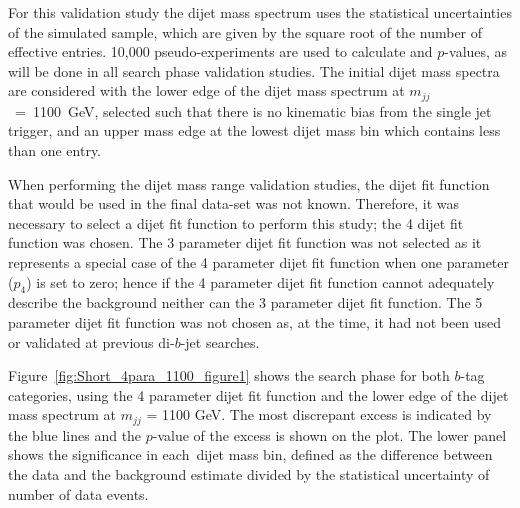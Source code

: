 For this validation study the dijet mass spectrum uses 
the statistical uncertainties of the simulated sample,
which are given by the square root of the number of effective entries.
10,000 pseudo-experiments are used to calculate \bh{} and \dhunt{} $p$-values, as will be done in all \summer{} search phase validation studies.
The initial dijet mass spectra are considered with the lower edge of the dijet mass spectrum at $m_{jj}$~=~1100~GeV,
selected such that there is no kinematic bias from the single jet trigger,
and an upper mass edge at the lowest dijet mass bin which contains less than one entry.

When performing the dijet mass range validation studies,
the dijet fit function that would be used in the final data-set was not known.
Therefore, it was necessary to select a dijet fit function to perform this study;
the 4 dijet fit function was chosen.
The 3 parameter dijet fit function was not selected as it represents a special case
of the 4 parameter dijet fit function when one parameter ($p_4$) is set to zero;
hence if the 4 parameter dijet fit function cannot adequately describe the background neither can the 3 parameter dijet fit function.
The 5 parameter dijet fit function was not chosen as, at the time,
it had not been used or validated at previous di-$b$-jet searches.

Figure~\ref{fig:Short_4para_1100_figure1} shows the search phase
for both $b$-tag categories, using the 4 parameter dijet fit function and the lower edge of the dijet mass spectrum at $m_{jj}$ = 1100 GeV.
The most discrepant excess is indicated by the blue lines and the \bh{} \mbox{$p$-value} of the excess is shown on the plot.
The lower panel shows the significance in each~dijet mass bin,
defined as the difference between the data and the background estimate divided by the statistical uncertainty of number of data events.

